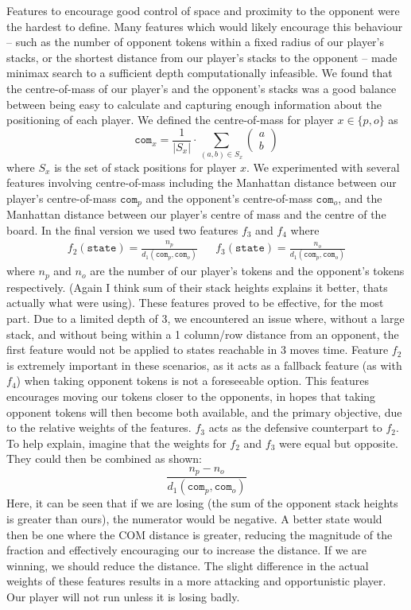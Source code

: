 \documentclass[11pt]{article}
\newcommand{\drafting}[1]{\textcolor{OliveGreen}{#1}}
\begin{document}
Features to encourage good control of space and proximity to the opponent were the hardest to define. Many features which would likely encourage this behaviour -- such as the number of opponent tokens within a fixed radius of our player's stacks, or the shortest distance from our player's stacks to the opponent -- made minimax search to a sufficient depth computationally infeasible. We found that the centre-of-mass of our player's and the opponent's stacks was a good balance between being easy to calculate and capturing enough information about the positioning of each player. We defined the centre-of-mass for player $x \in \{p, o\}$ as 
\[
    \texttt{com}_x = \frac{1}{|S_x|} \cdot \sum _{(a, b) \in S_x} \begin{pmatrix}
        a \\ b
    \end{pmatrix}
\]
where $S_x$ is the set of stack positions for player $x$. We experimented with several features involving centre-of-mass including the Manhattan distance between our player's centre-of-mass $\texttt{com}_p$ and the opponent's centre-of-mass $\texttt{com}_o$, and the Manhattan distance between our player's centre of mass and the centre of the board. In the final version we used two features $f_3$ and $f_4$ where
\begin{align*}
    f_2(\texttt{state}) = \frac{n_p}{d_1(\texttt{com}_p, \texttt{com}_o)} && f_3(\texttt{state}) = \frac{n_o}{d_1(\texttt{com}_p, \texttt{com}_o)}
\end{align*}
where $n_p$ and $n_o$ are the number of our player's tokens and the opponent's tokens respectively.\drafting{ (Again I think sum of their stack heights explains it better, thats actually what were using).} \drafting{These features proved to be effective, for the most part. Due to a limited depth of 3, we encountered an issue where, without a large stack, and without being within a 1 column/row distance from an opponent, the first feature would not be applied to states reachable in 3 moves time. Feature $f_2$ is extremely important in these scenarios, as it acts as a fallback feature (as with $f_4$) when taking opponent tokens is not a foreseeable option. This features encourages moving our tokens closer to the opponents, in hopes that taking opponent tokens will then become both available, and the primary objective, due to the relative weights of the features. $f_3$ acts as the defensive counterpart to $f_2$. To help explain, imagine that the weights for $f_2$ and $f_3$ were equal but opposite. They could then be combined as shown:
\[
    \frac{n_p - n_o}{d_1(\texttt{com}_p, \texttt{com}_o)}
\]
Here, it can be seen that if we are losing (the sum of the opponent stack heights is greater than ours), the numerator would be negative. A better state would then be one where the COM distance is greater, reducing the magnitude of the fraction and effectively encouraging our to increase the distance. If we are winning, we should reduce the distance. The slight difference in the actual weights of these features results in a more attacking and opportunistic player. Our player will not run unless it is losing badly.
}
\end{document}
